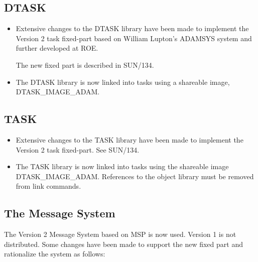 \subsection{DTASK}
\label{dtask}
\begin{itemize}
\item Extensive changes to the DTASK library have been made to implement the 
Version 2 task fixed-part based on William Lupton's ADAMSYS system and further
developed at ROE.

The new fixed part is described in SUN/134.
\item The DTASK library is now linked into tasks using a shareable image,
DTASK\_IMAGE\_ADAM.
\end{itemize}

\subsection{TASK}
\label{task}
\begin{itemize}
\item Extensive changes to the TASK library have been made to implement the 
Version 2 task fixed-part.
See SUN/134.
\item The TASK library is now linked into tasks using the shareable image
DTASK\_IMAGE\_ADAM. References to the object library must be removed from
link commands.
\end{itemize}

\subsection{The Message System}
The Version 2 Message System based on MSP is now used.
Version 1 is not distributed.
Some changes have been made to support the new fixed part and rationalize the
system as follows:

